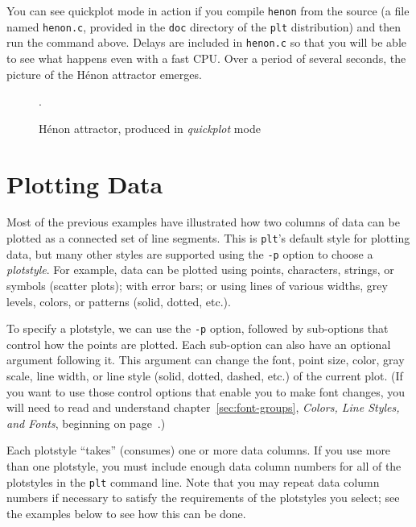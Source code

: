 \documentclass{book}
\begin{document}
\noindent
You can see quickplot mode in action if you compile {\tt henon} from the
source (a file named {\tt henon.c}, provided in the {\tt doc} directory of
the {\tt plt} distribution) and then run the command above.  Delays are
included in {\tt henon.c} so that you will be able to see what happens
even with a fast CPU.  Over a period of several seconds, the picture of the
H\'{e}non attractor emerges.

\begin{figure}[h]
\begin{center}
\end{center}
\caption{H\'{e}non attractor, produced in {\em quickplot}
mode\label{fig:henon}}.
\end{figure}

\chapter{Plotting Data \label{sec:plotting-data}}

%
Most of the previous examples have illustrated how two columns of data can be
plotted as a connected set of line segments.  This is {\tt plt}'s
default style for plotting data, but many other styles are supported
using the {\tt -p} option to choose a {\em plotstyle}.  For example, data can
be plotted using points, characters, strings, or symbols (scatter
plots);  with error bars;  or using lines of various widths, grey levels,
colors, or patterns (solid, dotted, etc.).

%
%
%
%
%
To specify a plotstyle, we can use the {\tt -p} option, followed by
sub-options that control how the points are plotted.  Each sub-option
can also have an optional argument following it.  This argument can
change the font, point size, color, gray scale, line width, or line
style (solid, dotted, dashed, etc.)  of the current plot.  (If you want
to use those control options that enable you to make font changes, you
will need to read and understand chapter~\ref{sec:font-groups}, {\em
Colors, Line Styles, and Fonts}, beginning on
page~\pageref{sec:font-groups}.)

%
Each plotstyle ``takes'' (consumes) one or more data columns.  If you
use more than one plotstyle, you must include enough data column
numbers for all of the plotstyles in the {\tt plt} command line.  Note
that you may repeat data column numbers if necessary to satisfy the
requirements of the plotstyles you select;  see the examples below to
see how this can be done.
\end{document}
